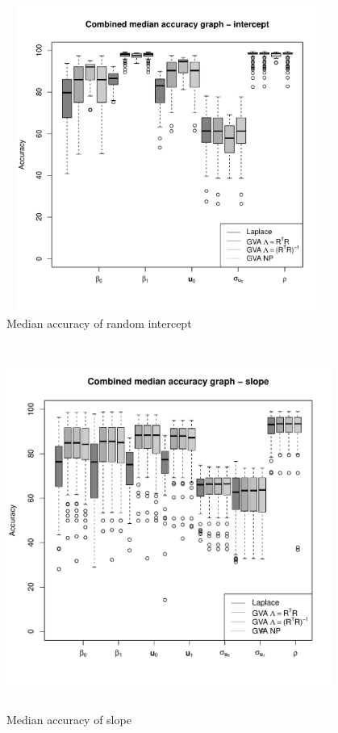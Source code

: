 			\begin{figure}
				\begin{center}
					\includegraphics[width=0.95\textwidth, height=100mm]{code/results/median_accuracy_combined_intercept.pdf}
					\caption{Median accuracy of random intercept}
					\label{fig:median_accuracy_intercept}
				\end{center}
			\end{figure}
					
			\begin{figure}
				\includegraphics[width=0.95\textwidth, height=120mm]{code/results/median_accuracy_combined_slope.pdf}
				\caption{Median accuracy of slope}
				\label{fig:median_accuracy_slope}
			\end{figure}
					

